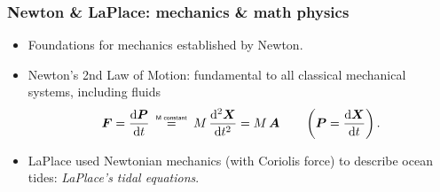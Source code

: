 \documentclass[10pt]{beamer}
\newcommand\myeq{\mathrel{\overset{\makebox[0pt]{\mbox{\normalfont\tiny\sffamily M constant}}}{=}}}
\begin{document}
\begin{frame}
  \frametitle{Newton \& LaPlace: mechanics \& math physics}

\begin{center}
\vspace{-.25cm}
\hspace{2cm} 
\vspace{-.3cm}
\end{center}

\vspace{-.2cm}
\begin{exampleblock}{}
\begin{itemize}
\item Foundations for mechanics established by Newton.
\item Newton's 2nd Law of Motion: fundamental to all classical mechanical systems, including fluids 
\begin{equation}
   {\bm F} = \frac{\mathrm{d}{\bm P}}{\mathrm{d}t}  \; \; \; \;  \myeq \; \; \; \;   M \, \frac{\mathrm{d}^{2} {\bm X}}{\mathrm{d}t^{2}} = M \, {\bm A}
  \qquad \left( {\bm P} = \frac{\mathrm{d}{\bm X}}{\mathrm{d}t}   \right).
\end{equation}
\item LaPlace used Newtonian mechanics (with Coriolis force) to
  describe ocean tides: {\it LaPlace's tidal equations}.
\end{itemize}
\end{exampleblock}{}


\end{frame}
\end{document}
